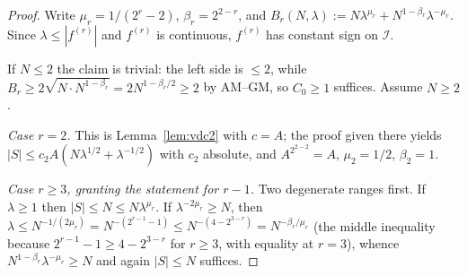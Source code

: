\documentclass[11pt]{article}
\theoremstyle{definition}
\theoremstyle{plain}
\begin{document}
\begin{proof}
Write $\mu_{r}=1/(2^{r}-2)$, $\beta_{r}=2^{2-r}$, and
$B_{r}(N,\lambda):=N\lambda^{\mu_{r}}+N^{1-\beta_{r}}\lambda^{-\mu_{r}}$.
Since $\lambda\le|f^{(r)}|$ and $f^{(r)}$ is continuous, $f^{(r)}$ has
constant sign on $\mathcal I$.

If $N\le2$ the claim is trivial: the left side is $\le2$, while
$B_{r}\ge2\sqrt{N\cdot N^{1-\beta_{r}}}=2N^{1-\beta_{r}/2}\ge2$ by
AM--GM, so $C_{0}\ge1$ suffices.  Assume $N\ge2$.

\emph{Case $r=2$.}  This is Lemma~\ref{lem:vdc2} with $c=A$; the proof
given there yields $|S|\le c_{2}A(N\lambda^{1/2}+\lambda^{-1/2})$ with
$c_{2}$ absolute, and $A^{2^{2-2}}=A$, $\mu_{2}=1/2$, $\beta_{2}=1$.

\emph{Case $r\ge3$, granting the statement for $r-1$.}  Two degenerate
ranges first.  If $\lambda\ge1$ then $|S|\le N\le N\lambda^{\mu_{r}}$.  If
$\lambda^{-2\mu_{r}}\ge N$, then
$\lambda\le N^{-1/(2\mu_{r})}=N^{-(2^{r-1}-1)}\le N^{-(4-2^{3-r})}
=N^{-\beta_{r}/\mu_{r}}$
(the middle inequality because $2^{r-1}-1\ge4-2^{3-r}$ for $r\ge3$, with
equality at $r=3$), whence
$N^{1-\beta_{r}}\lambda^{-\mu_{r}}\ge N$ and again $|S|\le N$ suffices.


\end{proof}
\end{document}
